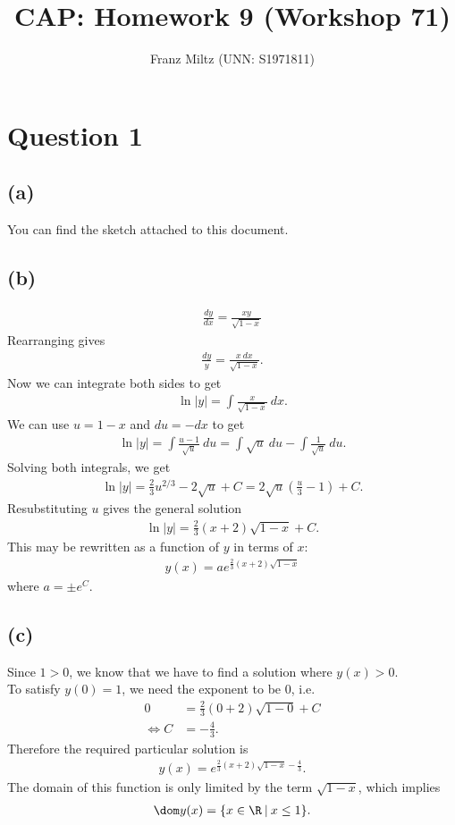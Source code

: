 \documentclass{article}
\title{CAP: Homework 9 (Workshop 71)}
\author{Franz Miltz (UNN: S1971811)}
\begin{document}
\maketitle
\section*{Question 1}
\subsection*{(a)}
You can find the sketch attached to this document.
\subsection*{(b)}
\begin{align*}
  \frac{dy}{dx}=\frac{xy}{\sqrt{1-x}}
\end{align*}
Rearranging gives
\begin{align*}
  \frac{dy}{y}=\frac{x\:dx}{\sqrt{1-x}}.
\end{align*}
Now we can integrate both sides to get
\begin{align*}
  \ln|y| = \int \frac{x}{\sqrt{1-x}}\:dx.
\end{align*}
We can use $u=1-x$ and $du=-dx$ to get
\begin{align*}
  \ln|y| = \int \frac{u-1}{\sqrt{u}}\:du=\int \sqrt{u}\:du - \int \frac{1}{\sqrt{u}}\:du.
\end{align*}
Solving both integrals, we get
\begin{align*}
  \ln|y|=\frac{2}{3}u^{2/3}-2\sqrt{u}+C=2\sqrt{u}\left(\frac{u}{3}-1\right)+C.
\end{align*}
Resubstituting $u$ gives the general solution
\begin{align*}
  \ln|y|=\frac{2}{3}(x+2)\sqrt{1-x}+C.
\end{align*}
This may be rewritten as a function of $y$ in terms of $x$:
\begin{align*}
  y(x)=  ae^{\frac{2}{3}(x+2)\sqrt{1-x}}
\end{align*}
where $a=\pm e^C$.
\subsection*{(c)}
Since $1>0$, we know that we have to find a solution where $y(x)>0$.\\
To satisfy $y(0)=1$, we need the exponent to be $0$, i.e.
\begin{align*}
  0&=\frac{2}{3}(0+2)\sqrt{1-0}+C\\
  \Leftrightarrow C &= -\frac{4}{3}.
\end{align*}
Therefore the required particular solution is
\begin{align*}
  y(x)=e^{\frac{2}{3}(x+2)\sqrt{1-x}-\frac{4}{3}}.
\end{align*}
The domain of this function is only limited by the term $\sqrt{1-x}$, which implies \begin{align*}
  \dom y(x) = \{x\in\R\:|\: x\leq 1\}.
\end{align*}
\end{document}
